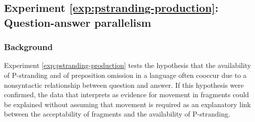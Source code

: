 \label{exp:pstranding-production}
\subsection{Experiment \ref{exp:pstranding-production}: Question-answer parallelism}
\label{sec:pstranding-production}

\subsubsection{Background}
\label{sec:pstranding-production-background}

Experiment \ref{exp:pstranding-production} tests the hypothesis that the availability of P-stranding and of preposition omission in a language often cooccur due to a nonsyntactic relationship between question and answer. If this hypothesis were confirmed, the data that \citet{merchant2004} interprets as evidence for movement in fragments could be explained without assuming that movement is required as an explanatory link between the acceptability of fragments and the availability of P-stranding.

